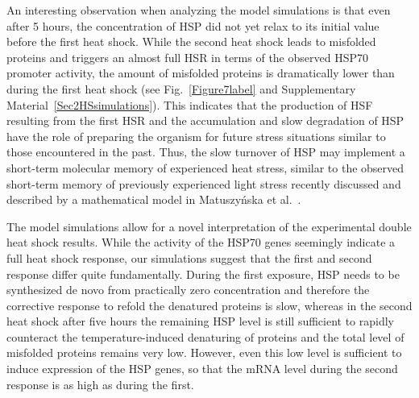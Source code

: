 \documentclass[oneside, 10pt, a4paper, twocolumn]{article}
\begin{document}
An interesting observation when analyzing the model simulations is
that even after 5 hours, the concentration of HSP did not yet relax
to its initial value before the first heat shock. 
While the second heat shock leads to misfolded
proteins and triggers an almost full HSR in terms of 
the observed HSP70 promoter activity, the amount of misfolded proteins
is dramatically lower than during the first heat shock (see Fig.~\ref{Figure7label} 
and Supplementary Material~\ref{Sec2HSsimulations}). 
This indicates that the 
production of HSF resulting from the first HSR and the accumulation
and slow degradation of HSP have the role of preparing the organism for future
stress situations similar to those encountered in the past. Thus, the slow turnover of HSP may
implement a short-term molecular memory of experienced heat stress,
similar to the observed short-term memory of previously experienced light
stress recently discussed and described by a mathematical model 
in Matuszy\'{n}ska et al.~\cite{Matuszynska2016}.

The model simulations allow for a novel interpretation of
the experimental  double heat shock results. While the
activity of the HSP70 genes seemingly indicate a full heat shock response, our simulations suggest that the first and second response differ quite fundamentally.
During the first exposure, HSP needs to be synthesized de novo
from practically zero concentration and therefore the corrective
response to refold the denatured proteins is slow, whereas in the second heat
shock after five hours the remaining HSP level is still sufficient to rapidly
counteract the temperature-induced denaturing of proteins and the total
level of misfolded proteins remains very low. However, even this low level is
sufficient to induce expression of the HSP genes, so that the mRNA level
during the second response is as high as during the first.


\end{document}
